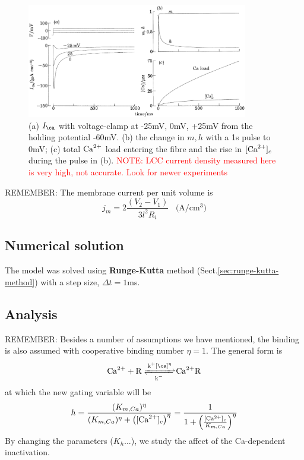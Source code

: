 \begin{figure}[hbt]
  \centerline{\includegraphics[height=5cm,
    angle=0]{./images/SS_calcium.eps}}
  \caption{(a) $I_\ca $ with voltage-clamp at -25mV, 0mV, +25mV from the
    holding potential -60mV. (b) the change in $m,h$ with a 1s pulse to
    0mV; (c) total ${\text{Ca}^{2+}}$ load entering the fibre and the rise in $[{\text{Ca}^{2+}}]_c$
    during the pulse in (b). \textcolor{red}{NOTE: LCC current density measured
    here is very high, not accurate. Look for newer experiments}}
  \label{fig:SS_Calcium}
\end{figure}

\begin{framed}
  REMEMBER: The membrane current per unit volume is
  \begin{equation}
    \label{eq:1040}
    j_m = 2\frac{(V_2-V_1)}{3l^2R_i} \;\;\;\text{(A/cm$^3$)}
  \end{equation}
\end{framed}

\subsection{Numerical solution}
\label{sec:numerical-solution-3}

The model was solved using {\bf Runge-Kutta} method
(Sect.\ref{sec:runge-kutta-method}) with a step size, $\Delta t = 1$ms.

\subsection{Analysis}
\label{sec:analysis-6}


REMEMBER: Besides a number of assumptions we have mentioned, the binding is also
assumed with cooperative binding number $\eta=1$. The general form is
\begin{equation}
  \label{eq:627}
  \ce{Ca^2+ + R <=>[k^+\ce{[\ca]^\eta}][k^-] Ca^2+R}
\end{equation}
at which the new gating variable will be
\begin{equation}
  \label{eq:945}
  h = \frac{(K_{m,Ca})^\eta}{(K_{m,Ca})^\eta +
    \left([{\text{Ca}^{2+}}]_c\right)^\eta} = \frac{1}{1 + \left(\frac{[{\text{Ca}^{2+}}]_c}{K_{m,Ca}}\right)^\eta}
\end{equation}
By changing the parameters ($K_h$...), we study the affect of the
Ca-dependent inactivation.

